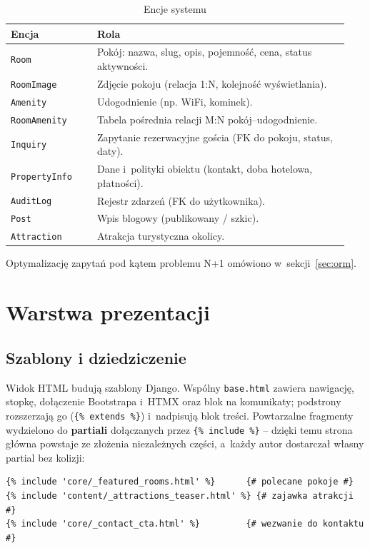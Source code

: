 \documentclass[12pt,a4paper]{article}
\begin{document}
\begin{longtable}{p{0.24\linewidth}p{0.70\linewidth}}
\caption{Encje systemu}\label{tab:encje}\\
\toprule
\textbf{Encja} & \textbf{Rola} \\
\midrule
\endhead
\texttt{Room}        & Pokój: nazwa, slug, opis, pojemność, cena, status aktywności. \\
\texttt{RoomImage}   & Zdjęcie pokoju (relacja 1:N, kolejność wyświetlania). \\
\texttt{Amenity}     & Udogodnienie (np. WiFi, kominek). \\
\texttt{RoomAmenity} & Tabela pośrednia relacji M:N pokój--udogodnienie. \\
\texttt{Inquiry}     & Zapytanie rezerwacyjne gościa (FK do pokoju, status, daty). \\
\texttt{PropertyInfo}& Dane i~polityki obiektu (kontakt, doba hotelowa, płatności). \\
\texttt{AuditLog}    & Rejestr zdarzeń (FK do użytkownika). \\
\texttt{Post}        & Wpis blogowy (publikowany / szkic). \\
\texttt{Attraction}  & Atrakcja turystyczna okolicy. \\
\bottomrule
\end{longtable}

Optymalizację zapytań pod kątem problemu N+1 omówiono w~sekcji~\ref{sec:orm}.

\section{Warstwa prezentacji}
\label{sec:frontend}

\subsection{Szablony i dziedziczenie}

Widok HTML budują szablony Django. Wspólny \texttt{base.html} zawiera nawigację,
stopkę, dołączenie Bootstrapa i~HTMX oraz blok na komunikaty; podstrony rozszerzają
go (\texttt{\{\% extends \%\}}) i~nadpisują blok treści. Powtarzalne fragmenty
wydzielono do \textbf{partiali} dołączanych przez \texttt{\{\% include \%\}} -- dzięki
temu strona główna powstaje ze złożenia niezależnych części, a~każdy autor dostarczał
własny partial bez kolizji:

\begin{lstlisting}[style=djangostyle, caption={Składanie strony głównej z partiali (index.html)}]
{% include 'core/_featured_rooms.html' %}      {# polecane pokoje #}
{% include 'content/_attractions_teaser.html' %} {# zajawka atrakcji #}
{% include 'core/_contact_cta.html' %}         {# wezwanie do kontaktu #}
\end{lstlisting}
\end{document}
